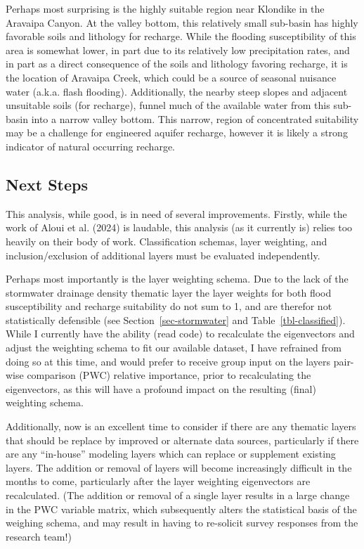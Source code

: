 \documentclass[
]{agujournal2019}
\begin{document}
Perhaps most surprising is the highly suitable region near Klondike in
the Aravaipa Canyon. At the valley bottom, this relatively small
sub-basin has highly favorable soils and lithology for recharge. While
the flooding susceptibility of this area is somewhat lower, in part due
to its relatively low precipitation rates, and in part as a direct
consequence of the soils and lithology favoring recharge, it is the
location of Aravaipa Creek, which could be a source of seasonal nuisance
water (a.k.a. flash flooding). Additionally, the nearby steep slopes and
adjacent unsuitable soils (for recharge), funnel much of the available
water from this sub-basin into a narrow valley bottom. This narrow,
region of concentrated suitability may be a challenge for engineered
aquifer recharge, however it is likely a strong indicator of natural
occurring recharge.

\subsection{Next Steps}\label{next-steps}

This analysis, while good, is in need of several improvements. Firstly,
while the work of Aloui et al. (2024) is laudable, this analysis (as it
currently is) relies too heavily on their body of work. Classification
schemas, layer weighting, and inclusion/exclusion of additional layers
must be evaluated independently.

Perhaps most importantly is the layer weighting schema. Due to the lack
of the stormwater drainage density thematic layer the layer weights for
both flood susceptibility and recharge suitability do not sum to 1, and
are therefor not statistically defensible (see
Section~\ref{sec-stormwater} and Table~\ref{tbl-classified}). While I
currently have the ability (read code) to recalculate the eigenvectors
and adjust the weighting schema to fit our available dataset, I have
refrained from doing so at this time, and would prefer to receive group
input on the layers pair-wise comparison (PWC) relative importance,
prior to recalculating the eigenvectors, as this will have a profound
impact on the resulting (final) weighting schema.

Additionally, now is an excellent time to consider if there are any
thematic layers that should be replace by improved or alternate data
sources, particularly if there are any ``in-house'' modeling layers
which can replace or supplement existing layers. The addition or removal
of layers will become increasingly difficult in the months to come,
particularly after the layer weighting eigenvectors are recalculated.
(The addition or removal of a single layer results in a large change in
the PWC variable matrix, which subsequently alters the statistical basis
of the weighing schema, and may result in having to re-solicit survey
responses from the research team!)
\end{document}
